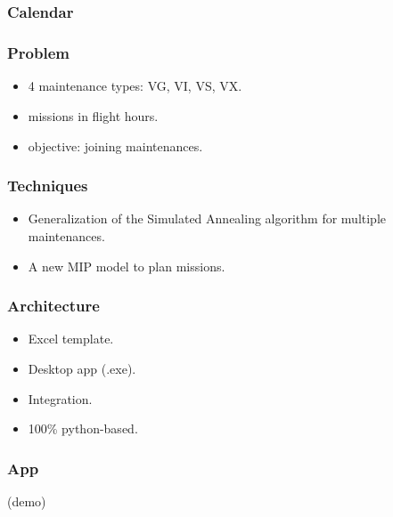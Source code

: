 \section[Dassault]{\dassault}

\begin{frame}
\frametitle{\textbf{Calendar}}

    


\end{frame}

\begin{frame}
\frametitle{\textbf{Problem}}

  \begin{itemize}[<+->]
    \item 4 maintenance types: VG, VI, VS, VX.
    \item missions in flight hours.
    \item objective: joining maintenances.
  \end{itemize}
\end{frame}

\begin{frame}
\frametitle{\textbf{Techniques}}

  \begin{itemize}[<+->]
    \item Generalization of the Simulated Annealing algorithm for multiple maintenances.
    \item A new MIP model to plan missions.
  \end{itemize}
  

\end{frame}

\begin{frame}
\frametitle{\textbf{Architecture}}

  \begin{itemize}[<+->]
    \item Excel template.
    \item Desktop app (.exe).
    \item Integration.
    \item 100\% python-based.
  \end{itemize}

  \begin{adjustbox}{max totalsize={.7\textwidth}{.7\textheight},center}
    
  \end{adjustbox}


\end{frame}


\begin{frame}
\frametitle{\textbf{App}}

  (demo)

\end{frame}
